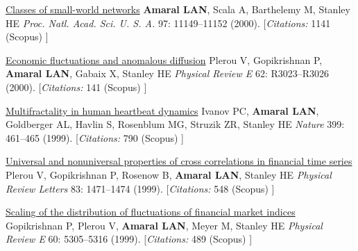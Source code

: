 \NumberedItem{\makebox[0.8cm][r]{[32]}}
\href{/people/amaral/classes-of-small-world-networks}
{Classes of small-world networks}
\newline
{\textbf{Amaral LAN}}, Scala A, Barthelemy M, Stanley HE
\newline
\textit{Proc. Natl. Acad. Sci. U. S. A.}
    97:
11149--11152 (2000).
    [{\em{Citations:}}  1141 (Scopus) ]
\newline
\Gap
~
\Gap

\NumberedItem{\makebox[0.8cm][r]{[31]}}
\href{/people/amaral/economic-fluctuations-and-anomalous-diffusion}
{Economic fluctuations and anomalous diffusion}
\newline
Plerou V, Gopikrishnan P, {\textbf{Amaral LAN}}, Gabaix X, Stanley HE
\newline
\textit{Physical Review E}
    62:
R3023--R3026 (2000).
    [{\em{Citations:}}  141 (Scopus) ]
\newline
\Gap
~
\Gap

\NumberedItem{\makebox[0.8cm][r]{[30]}}
\href{/people/amaral/multifractality-in-human-heartbeat-dynamics}
{Multifractality in human heartbeat dynamics}
\newline
Ivanov PC, {\textbf{Amaral LAN}}, Goldberger AL, Havlin S, Rosenblum MG, Struzik ZR, Stanley HE
\newline
\textit{Nature}
    399:
461--465 (1999).
    [{\em{Citations:}}  790 (Scopus) ]
\newline
\Gap
~
\Gap

\NumberedItem{\makebox[0.8cm][r]{[29]}}
\href{/people/amaral/universal-and-nonuniversal-properties-of-cross-correlations-in-financial-time-series}
{Universal and nonuniversal properties of cross correlations in financial time series}
\newline
Plerou V, Gopikrishnan P, Rosenow B, {\textbf{Amaral LAN}}, Stanley HE
\newline
\textit{Physical Review Letters}
    83:
1471--1474 (1999).
    [{\em{Citations:}}  548 (Scopus) ]
\newline
\Gap
~
\Gap

\NumberedItem{\makebox[0.8cm][r]{[28]}}
\href{/people/amaral/scaling-of-the-distribution-of-fluctuations-of-financial-market-indices}
{Scaling of the distribution of fluctuations of financial market indices}
\newline
Gopikrishnan P, Plerou V, {\textbf{Amaral LAN}}, Meyer M, Stanley HE
\newline
\textit{Physical Review E}
    60:
5305--5316 (1999).
    [{\em{Citations:}}  489 (Scopus) ]
\newline
\Gap
~
\Gap

